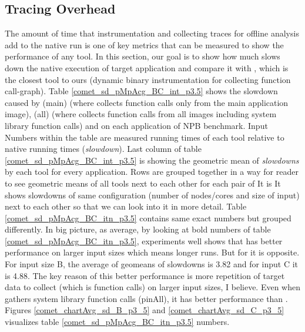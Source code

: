 



%





\subsection{Tracing Overhead}

The amount of time that instrumentation and collecting traces for offline analysis add to the native run is one of key metrics that can be measured to show the performance of any tool. In this section, our goal is to show how much \parlot slows down the native execution of target application and compare it with \callgrind, which is the closest tool to ours (dynamic binary instrumentation for collecting function call-graph). 
Table \ref{comet_sd_pMpAcg_BC_int_p3.5} shows the slowdown caused by \parlot(main) (where \parlot collects function calls only from the main application image), \parlot(all) (where \parlot collects function calls from all images including system library function calls) and \callgrind on each application of NPB benchmark.
Input  Numbers within the table are measured running times of each tool relative to native running times (\textit{slowdown}). Last column of table \ref{comet_sd_pMpAcg_BC_int_p3.5} is showing the geometric mean of \textit{slowdowns} by each tool for every application. Rows are grouped together in a way for reader to see geometric means of all tools next to each other for each pair of 
It is  It shows slowdowns of same configuration (number of nodes/cores and size of input) next to each other so that we can look into it in more detail.
Table \ref{comet_sd_pMpAcg_BC_itn_p3.5} contains same exact numbers but grouped differently. In big picture, as average, by looking at bold numbers of table \ref{comet_sd_pMpAcg_BC_itn_p3.5}, experiments well shows that \parlot has better performance on larger input sizes which means longer runs. But for \callgrind it is opposite. For input size B, the average of geomeans of slowdowns is 3.82 and for input C it is 4.88. The key reason of this better performance is more repetition of target data to collect (which is function calls) on larger input sizes, I believe. Even when \parlot gathers system library function calls (pinAll), it has better performance than \callgrind. Figures \ref{comet_chartAvg_sd_B_p3_5} and \ref{comet_chartAvg_sd_C_p3_5} visualizes table \ref{comet_sd_pMpAcg_BC_itn_p3.5} numbers.


